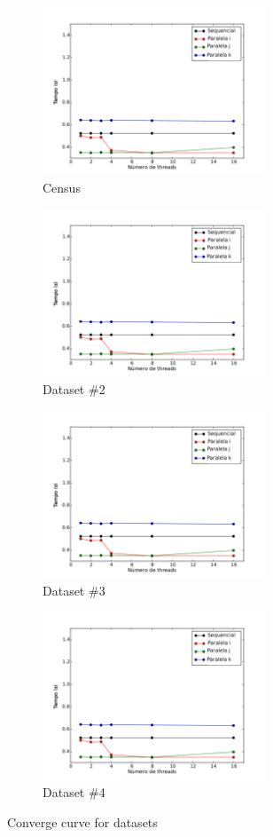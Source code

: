 	\begin{figure}[H]
		\centering
		\begin{subfigure}{.4\textwidth}
			\centering
			\includegraphics[height=5cm]{images/census}
			\caption{Census}
			\label{fig:census}
		\end{subfigure}
		\begin{subfigure}{.4\textwidth}
			\centering
			\includegraphics[height=5cm]{images/dataset2}
			\caption{Dataset \#2}
			\label{fig:dataset2}
		\end{subfigure}
		\begin{subfigure}{.4\textwidth}
			\centering
			\includegraphics[height=5cm]{images/dataset3}
			\caption{Dataset \#3}
			\label{fig:dataset3}
		\end{subfigure}
		\begin{subfigure}{.4\textwidth}
			\centering
			\includegraphics[height=5cm]{images/dataset4}
			\caption{Dataset \#4}
			\label{fig:dataset4}
		\end{subfigure}
		\caption{Converge curve for datasets}
		\label{fig:converge}
	\end{figure}
